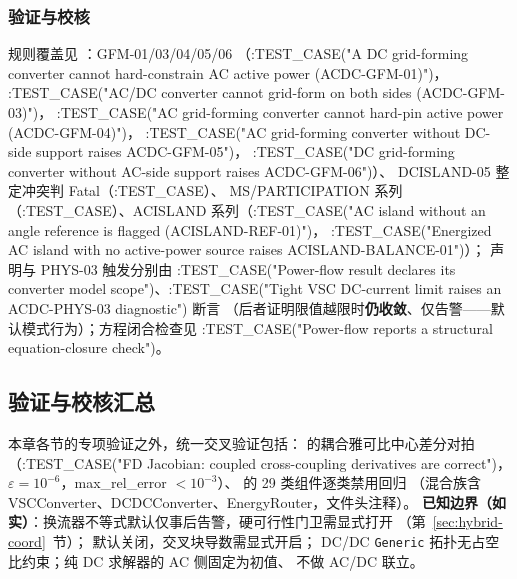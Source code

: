 \subsubsection*{验证与校核}
规则覆盖见 ：GFM-01/03/04/05/06
（:TEST\_CASE("A DC grid-forming converter cannot hard-constrain AC active power (ACDC-GFM-01)")，
:TEST\_CASE("AC/DC converter cannot grid-form on both sides (ACDC-GFM-03)")，
:TEST\_CASE("AC grid-forming converter cannot hard-pin active power (ACDC-GFM-04)")，
:TEST\_CASE("AC grid-forming converter without DC-side support raises ACDC-GFM-05")，
:TEST\_CASE("DC grid-forming converter without AC-side support raises ACDC-GFM-06")）、
DCISLAND-05 整定冲突判 Fatal（:TEST\_CASE）、
MS/PARTICIPATION 系列（:TEST\_CASE）、ACISLAND 系列（:TEST\_CASE("AC island without an angle reference is flagged (ACISLAND-REF-01)")，
:TEST\_CASE("Energized AC island with no active-power source raises ACISLAND-BALANCE-01")）；
 声明与 PHYS-03 触发分别由 :TEST\_CASE("Power-flow result declares its converter model scope")、:TEST\_CASE("Tight VSC DC-current limit raises an ACDC-PHYS-03 diagnostic") 断言
（后者证明限值越限时\textbf{仍收敛}、仅告警——默认模式行为）；方程闭合检查见 :TEST\_CASE("Power-flow reports a structural equation-closure check")。

\subsection{验证与校核汇总}
本章各节的专项验证之外，统一交叉验证包括：
的耦合雅可比中心差分对拍（:TEST\_CASE("FD Jacobian: coupled cross-coupling derivatives are correct")，$\varepsilon=10^{-6}$，max\_rel\_error $<10^{-3}$）、
 的 29 类组件逐类禁用回归
（混合族含 VSCConverter、DCDCConverter、EnergyRouter，文件头注释）。
\textbf{已知边界（如实）}：换流器不等式默认仅事后告警，硬可行性门卫需显式打开
（第~\ref{sec:hybrid-coord}~节）；
 默认关闭，交叉块导数需显式开启；
DC/DC \texttt{Generic} 拓扑无占空比约束；纯 DC 求解器的 AC 侧固定为初值、
不做 AC/DC 联立。

